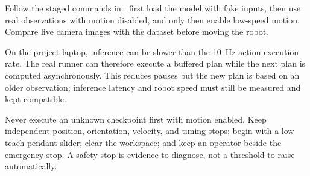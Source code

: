 \begin{center}
\end{center}

Follow the staged commands in : first load the model
with fake inputs, then use real observations with motion disabled, and only
then enable low-speed motion. Compare live camera images with the dataset before
moving the robot.

On the project laptop, inference can be slower than the 10~Hz action execution
rate. The real runner can therefore execute a buffered plan while the next plan
is computed asynchronously. This reduces pauses but the new plan is based on an
older observation; inference latency and robot speed must still be measured and
kept compatible.

\begin{safetybox}
Never execute an unknown checkpoint first with motion enabled. Keep independent
position, orientation, velocity, and timing stops; begin with a low
teach-pendant slider; clear the workspace; and keep an operator beside the
emergency stop. A safety stop is evidence to diagnose, not a threshold to raise
automatically.
\end{safetybox}
